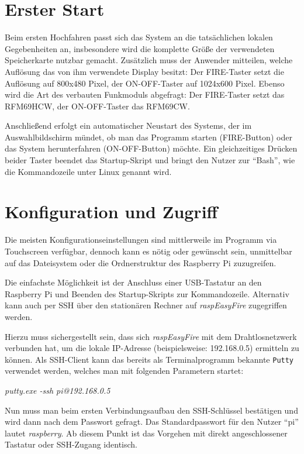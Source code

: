 \documentclass[paper=a4, parskip, numbers=noenddot, toc=listof, headsepline]{scrbook}
\newcommand{\REF}{\emph{raspEasyFire}}
\begin{document}
		\section{Erster Start}

			Beim ersten Hochfahren passt sich das System an die tatsächlichen lokalen Gegebenheiten an, insbesondere wird die komplette Größe der verwendeten Speicherkarte nutzbar gemacht. Zusätzlich muss der Anwender mitteilen, welche Auflösung das von ihm verwendete Display besitzt: Der FIRE-Taster setzt die Auflösung auf 800x480 Pixel, der ON-OFF-Taster auf 1024x600 Pixel. Ebenso wird die Art des verbauten Funkmoduls abgefragt: Der FIRE-Taster setzt das RFM69HCW, der ON-OFF-Taster das RFM69CW.
			
			Anschließend erfolgt ein automatischer Neustart des Systems, der im Auswahlbildschirm mündet, ob man das Programm starten (FIRE-Button) oder das System herunterfahren (ON-OFF-Button) möchte. Ein gleichzeitiges Drücken beider Taster beendet das Startup-Skript und bringt den Nutzer zur \enquote{Bash}, wie die Kommandozeile unter Linux genannt wird.

		\section{Konfiguration und Zugriff}

			Die meisten Konfigurationseinstellungen sind mittlerweile im Programm via Touchscreen verfügbar, dennoch kann es nötig oder gewünscht sein, unmittelbar auf das Dateisystem oder die Ordnerstruktur des Raspberry Pi zuzugreifen.

			Die einfachste Möglichkeit ist der Anschluss einer USB-Tastatur an den Raspberry Pi und Beenden des Startup-Skripts zur Kommandozeile. Alternativ kann auch per SSH über den stationären Rechner auf {\REF} zugegriffen werden.

			Hierzu muss sichergestellt sein, dass sich {\REF} mit dem Drahtlosnetzwerk verbunden hat, um die lokale IP-Adresse (beispielsweise: 192.168.0.5) ermitteln zu können. Als SSH-Client kann das bereits als Terminalprogramm bekannte \texttt{Putty} verwendet werden, welches man mit folgenden Parametern startet:
			\begin{center}
				\emph{putty.exe -ssh pi@192.168.0.5}
			\end{center}

			Nun muss man beim ersten Verbindungsaufbau den SSH-Schlüssel bestätigen und wird dann nach dem Passwort gefragt. Das Standardpasswort für den Nutzer \enquote{pi} lautet \emph{raspberry}. Ab diesem Punkt ist das Vorgehen mit direkt angeschlossener Tastatur oder SSH-Zugang identisch.
\end{document}
